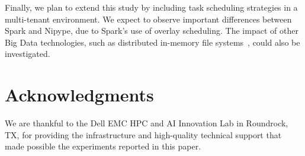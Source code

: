 \documentclass{IEEEtran}
\begin{document}
Finally, we plan to extend this study by including task scheduling 
strategies in a multi-tenant environment. We expect to observe 
important differences between Spark and Nipype, due to Spark's use of 
overlay scheduling. The impact of other Big Data technologies, such as 
distributed in-memory file systems~\cite{ignite}, could also be 
investigated.

\section{Acknowledgments}

We are thankful to the Dell EMC HPC and AI Innovation Lab
in Roundrock, TX, for providing the infrastructure and high-quality
technical support that made possible the experiments reported in this paper.

 

\end{document}
